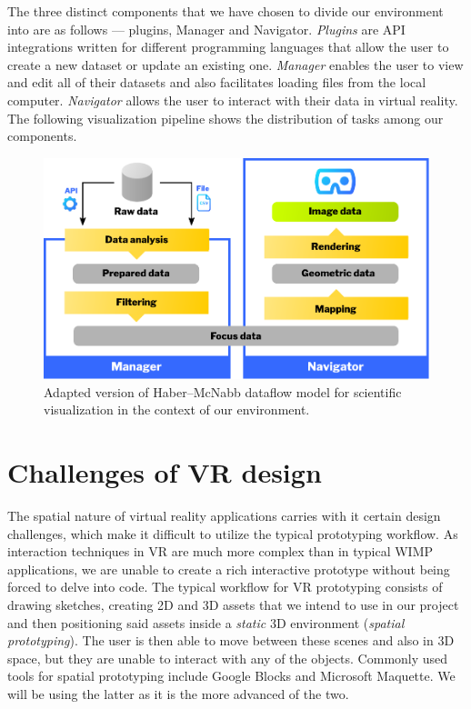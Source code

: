 \documentclass[thesis=M,english,hidelinks]{FITthesisXE}[2012/06/26]
\begin{document}
The three distinct components that we have chosen to divide our environment into are as follows --- plugins, Manager and Navigator. \emph{Plugins} are API integrations written for different programming languages that allow the user to create a new dataset or update an existing one. \emph{Manager} enables the user to view and edit all of their datasets and also facilitates loading files from the local computer. \emph{Navigator} allows the user to interact with their data in virtual reality. The following visualization pipeline shows the distribution of tasks among our components.

\begin{figure}[ht]
\centering
\includegraphics[scale=0.6]{pipeline}
\caption{Adapted version of Haber–McNabb dataflow model for scientific visualization in the context of our environment.\autocite{santos}}
\label{fig:pipeline}
\end{figure}

\section{Challenges of VR design}

The spatial nature of virtual reality applications carries with it certain design challenges, which make it difficult to utilize the typical prototyping workflow. As interaction techniques in VR are much more complex than in typical WIMP applications, we are unable to create a rich interactive prototype without being forced to delve into code. The typical workflow for VR prototyping consists of drawing sketches, creating 2D and 3D assets that we intend to use in our project and then positioning said assets inside a \emph{static} 3D environment (\emph{spatial prototyping}). The user is then able to move between these scenes and also in 3D space, but they are unable to interact with any of the objects.\autocite{vrprototyping} Commonly used tools for spatial prototyping include Google Blocks\autocite{googleblocks} and Microsoft Maquette\autocite{msmaquette}. We will be using the latter as it is the more advanced of the two.
\end{document}

